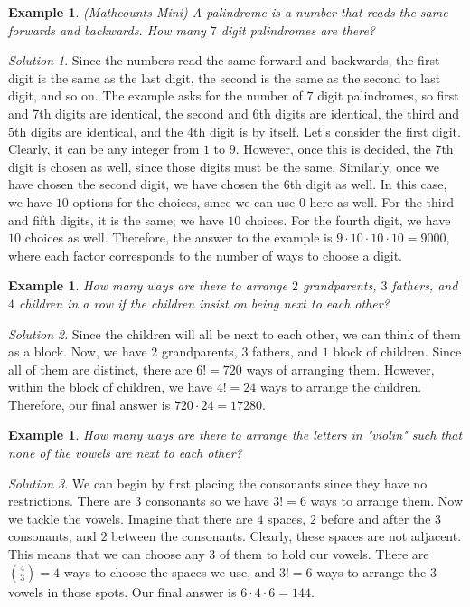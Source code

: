 \documentclass[letterpaper]{article}
\newtheorem{example}[thm]{Example}
\theoremstyle{remark}
\newtheorem*{solution}{Solution}
\theoremstyle{definition}
\begin{document}
\begin{example}
(Mathcounts Mini) A palindrome is a number that reads the same forwards and backwards. How many $7$ digit palindromes are there?

\end{example}

\begin{solution}
Since the numbers read the same forward and backwards, the first digit is the same as the last digit, the second is the same as the second to last digit, and so on. The example asks for the number of $7$ digit palindromes, so first and 7th digits are identical, the second and 6th digits are identical, the third and 5th digits are identical, and the 4th digit is by itself. Let's consider the first digit. Clearly, it can be any integer from $1$ to $9$. However, once this is decided, the 7th digit is chosen as well, since those digits must be the same. Similarly, once we have chosen the second digit, we have chosen the 6th digit as well. In this case, we have $10$ options for the choices, since we can use $0$ here as well. For the third and fifth digits, it is the same; we have $10$ choices. For the fourth digit, we have $10$ choices as well. Therefore, the answer to the example is $9\cdot 10\cdot 10 \cdot 10=9000$, where each factor corresponds to the number of ways to choose a digit.
\end{solution}

\begin{example}
How many ways are there to arrange $2$ grandparents, $3$ fathers, and $4$ children in a row if the children insist on being next to each other?
\end{example}

\begin{solution}
Since the children will all be next to each other, we can think of them as a block. Now, we have $2$ grandparents, $3$ fathers, and $1$ block of children. Since all of them are distinct, there are $6!=720$ ways of arranging them. However, within the block of children, we have $4!=24$ ways to arrange the children. Therefore, our final answer is $720\cdot 24=17280.$
\end{solution}

\begin{example}
How many ways are there to arrange the letters in "violin" such that none of the vowels are next to each other?
\end{example}

\begin{solution}
We can begin by first placing the consonants since they have no restrictions. There are $3$ consonants so we have $3!=6$ ways to arrange them. Now we tackle the vowels. 
Imagine that there are $4$ spaces, $2$ before and after the $3$ consonants, and $2$ between the consonants. Clearly, these spaces are not adjacent. This means that we can choose any $3$ of them to hold our vowels. There are $\binom{4}{3}=4$ ways to choose the spaces we use, and $3!=6$ ways to arrange the $3$ vowels in those spots. Our final answer is $6\cdot 4\cdot 6=144$.
\end{solution}
\end{document}
